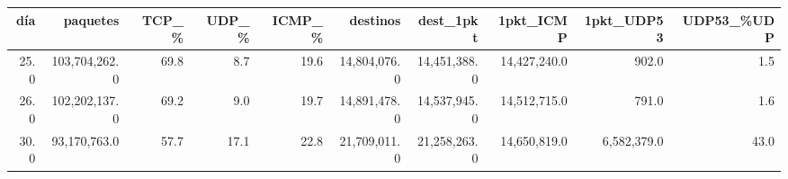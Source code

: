 \begin{tabular}{rrrrrrrrrr}
\toprule
día & paquetes & TCP\_\% & UDP\_\% & ICMP\_\% & destinos & dest\_1pkt & 1pkt\_ICMP & 1pkt\_UDP53 & UDP53\_\%UDP \\
\midrule
25.0 & 103,704,262.0 & 69.8 & 8.7 & 19.6 & 14,804,076.0 & 14,451,388.0 & 14,427,240.0 & 902.0 & 1.5 \\
26.0 & 102,202,137.0 & 69.2 & 9.0 & 19.7 & 14,891,478.0 & 14,537,945.0 & 14,512,715.0 & 791.0 & 1.6 \\
30.0 & 93,170,763.0 & 57.7 & 17.1 & 22.8 & 21,709,011.0 & 21,258,263.0 & 14,650,819.0 & 6,582,379.0 & 43.0 \\
\bottomrule
\end{tabular}
